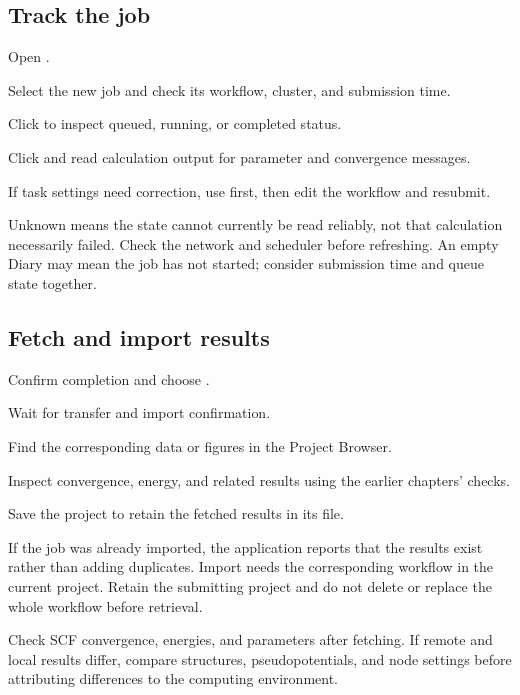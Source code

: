 \subsection{Track the job}

\begin{steps}
\item Open .
\item Select the new job and check its workflow, cluster, and submission time.
\item Click  to inspect queued, running, or completed status.
\item Click  and read calculation output for parameter and convergence messages.
\item If task settings need correction, use  first, then edit the workflow and resubmit.
\end{steps}

Unknown means the state cannot currently be read reliably, not that calculation necessarily failed. Check the network and scheduler before refreshing. An empty Diary may mean the job has not started; consider submission time and queue state together.

\subsection{Fetch and import results}

\begin{steps}
\item Confirm completion and choose .
\item Wait for transfer and import confirmation.
\item Find the corresponding data or figures in the Project Browser.
\item Inspect convergence, energy, and related results using the earlier chapters' checks.
\item Save the project to retain the fetched results in its  file.
\end{steps}

If the job was already imported, the application reports that the results exist rather than adding duplicates. Import needs the corresponding workflow in the current project. Retain the submitting project and do not delete or replace the whole workflow before retrieval.

Check SCF convergence, energies, and parameters after fetching. If remote and local results differ, compare structures, pseudopotentials, and node settings before attributing differences to the computing environment.

